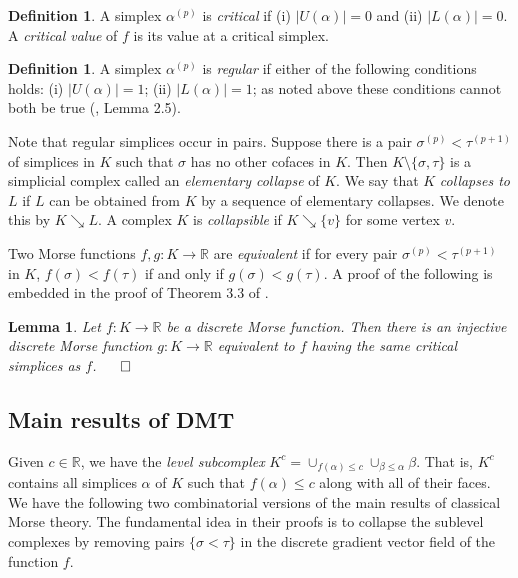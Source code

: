 \documentclass[11pt]{amsart}
\newtheorem{lemma}[theorem]{Lemma}
\theoremstyle{definition}
\newtheorem{definition}[theorem]{Definition}
\newcommand{\zr}{{\mathbb R}}
\newcommand{\Rspace}{{\mathbb R}}
\begin{document}
\begin{definition}
A simplex $\alpha^{(p)}$ is \emph{critical} if (i) $|U(\alpha)| = 0$ and (ii) $|L(\alpha)| = 0$. A {\em critical value} of $f$ is its value at a critical simplex. 
\end{definition}

\begin{definition}
A simplex $\alpha^{(p)}$ is \emph{regular} if either of the following conditions holds: (i) $|U(\alpha)| = 1$; (ii) $|L(\alpha)| = 1$; as noted above these conditions cannot both be true (\cite{forman}, Lemma 2.5). 
\end{definition}

Note that regular simplices occur in pairs. Suppose there is a pair $\sigma^{(p)}<\tau^{(p+1)}$ of simplices in $K$ such that $\sigma$ has no other cofaces in $K$. Then $K\setminus\{\sigma,\tau\}$ is a simplicial complex called an {\em elementary collapse} of $K$. We say that $K$ {\em collapses to} $L$ if $L$ can be obtained from $K$ by a sequence of elementary collapses. We denote this by $K\searrow L$. A complex $K$ is {\em collapsible} if $K\searrow \{v\}$ for some vertex $v$.

Two Morse functions $f,g:K\to\zr$ are {\em equivalent} if for every pair $\sigma^{(p)}<\tau^{(p+1)}$ in $K$, $f(\sigma)< f(\tau)$ if and only if $g(\sigma)< g(\tau)$. A proof of the following is embedded in the proof of Theorem 3.3 of \cite{forman}.

 \begin{lemma}\label{excellent} Let $f:K\to\zr$ be a discrete Morse function. Then there is an injective discrete Morse function $g:K\to\zr$ equivalent to $f$ having the same critical simplices as $f$. \hfill $\qed$
 \end{lemma}

\subsection*{Main results of DMT}
Given $c\in \Rspace$, we have the \emph{level subcomplex} $K^c = \cup_{f(\alpha) \leq c} \cup_{\beta \leq \alpha} \beta$. 
That is, $K^c$ contains all simplices $\alpha$ of $K$ such that $f(\alpha) \leq c$ along with all of their faces. 
We have the following two combinatorial versions of the main results of classical Morse theory. The fundamental idea in their proofs is to collapse the sublevel complexes by removing pairs $\{\sigma<\tau\}$ in the discrete gradient vector field of the function $f$.
\end{document}
